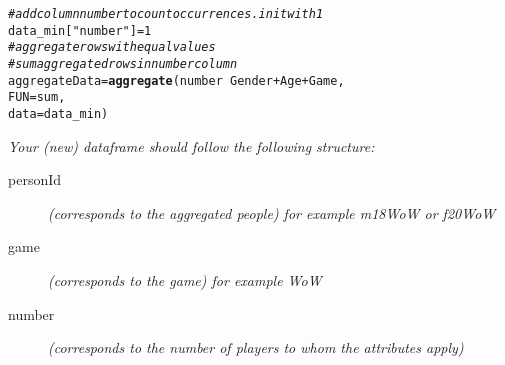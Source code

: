 \documentclass{article}\usepackage[]{graphicx}\usepackage[]{color}
\makeatletter
\newcommand{\hlnum}[1]{\textcolor[rgb]{0.686,0.059,0.569}{#1}}%
\newcommand{\hlstr}[1]{\textcolor[rgb]{0.192,0.494,0.8}{#1}}%
\newcommand{\hlcom}[1]{\textcolor[rgb]{0.678,0.584,0.686}{\textit{#1}}}%
\newcommand{\hlopt}[1]{\textcolor[rgb]{0,0,0}{#1}}%
\newcommand{\hlstd}[1]{\textcolor[rgb]{0.345,0.345,0.345}{#1}}%
\newcommand{\hlkwb}[1]{\textcolor[rgb]{0.69,0.353,0.396}{#1}}%
\newcommand{\hlkwc}[1]{\textcolor[rgb]{0.333,0.667,0.333}{#1}}%
\newcommand{\hlkwd}[1]{\textcolor[rgb]{0.737,0.353,0.396}{\textbf{#1}}}%
\newenvironment{kframe}{%
 \def\at@end@of@kframe{}%
 \ifinner\ifhmode%
  \def\at@end@of@kframe{\end{minipage}}%
  \begin{minipage}{\columnwidth}%
 \fi\fi%
 \def\FrameCommand##1{\hskip\@totalleftmargin \hskip-\fboxsep
 \colorbox{shadecolor}{##1}\hskip-\fboxsep
     \hskip-\linewidth \hskip-\@totalleftmargin \hskip\columnwidth}%
 \MakeFramed {\advance\hsize-\width
   \@totalleftmargin\z@ \linewidth\hsize
   \@setminipage}}%
 {\par\unskip\endMakeFramed%
 \at@end@of@kframe}
\newenvironment{knitrout}{}{} %
\makeatother
\begin{document}
\begin{knitrout}
\color{fgcolor}\begin{kframe}
\begin{alltt}
\hlcom{# add column number to count occurrences. init with 1 }
\hlstd{data_min[}\hlstr{"number"}\hlstd{]} \hlkwb{=} \hlnum{1}
\hlcom{# aggregate rows with equal values}
\hlcom{# sum aggregated rows in number column}
\hlstd{aggregateData} \hlkwb{=} \hlkwd{aggregate}\hlstd{(number} \hlopt{~} \hlstd{Gender} \hlopt{+} \hlstd{Age} \hlopt{+} \hlstd{Game,}
                          \hlkwc{FUN} \hlstd{= sum,}
                          \hlkwc{data}\hlstd{=data_min)}
\end{alltt}
\end{kframe}
\end{knitrout}

\emph{
Your (new) dataframe should follow the following structure:}
\begin{description}
\item[personId] \emph{(corresponds to the aggregated people) for example m18WoW or f20WoW }
\item[game] \emph{(corresponds to the game) for example WoW}
\item[number] \emph{(corresponds to the number of players to whom the attributes apply)}
\end{description}
\end{document}
